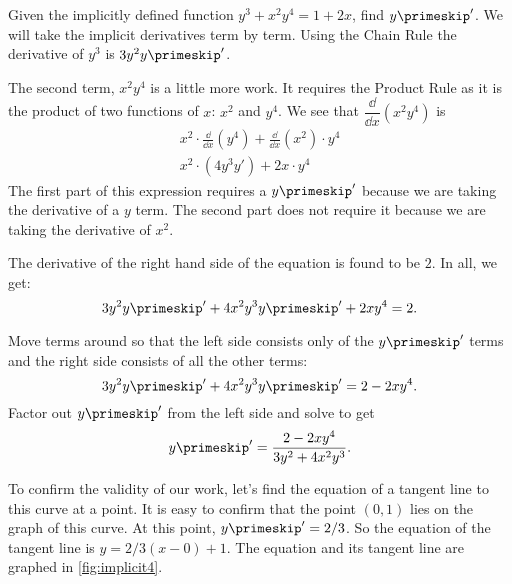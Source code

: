 \begin{example}\label{ex_implicit3}%
Given the implicitly defined function $y^3+x^2y^4=1+2x$, find $y\primeskip'$.
\solution
We will take the implicit derivatives term by term. Using the Chain Rule the derivative of $y^3$ is $3y^2 y\primeskip'$.

The second term, $x^2y^4$ is a little more work. It requires the Product Rule as it is the product of two functions of $x$: $x^2$ and $y^4$. We see that $\dfrac{\dd}{\dd x}(x^2y^4)$ is
\begin{gather*}
x^2 \cdot \frac{\dd}{\dd x}(y^4) + \frac{\dd}{\dd x}(x^2) \cdot y^4 \\
x^2 \cdot (4y^3y') + 2x \cdot y^4 
\end{gather*}
The first part of this expression requires a $y\primeskip'$ because we are taking the derivative of a $y$ term. The second part does not require it because we are taking the derivative of $x^2$.

The derivative of the right hand side of the equation is found to be $2$. In all, we get:\vspace{-.3\baselineskip}
\[3y^2y\primeskip' + 4x^2y^3y\primeskip' + 2xy^4 = 2.\]

Move terms around so that the left side consists only of the $y\primeskip'$ terms and the right side consists of all the other terms:
\[3y^2y\primeskip' + 4x^2y^3y\primeskip' = 2-2xy^4.\]
Factor out $y\primeskip'$ from the left side and solve to get
\[y\primeskip' = \frac{2-2xy^4}{3y^2+4x^2y^3}.\]

To confirm the validity of our work, let's find the equation of a tangent line to this curve at a point. It is easy to confirm that the point $(0,1)$ lies on the graph of this curve. At this point, $y\primeskip' = 2/3$. So the equation of the tangent line is $y = 2/3(x-0)+1$. The equation and its tangent line are graphed in \autoref{fig:implicit4}.


\end{example}

